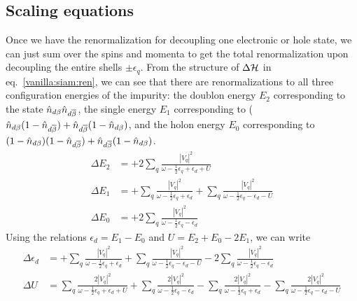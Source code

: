 \documentclass[12pt,twoside]{report}
\numberwithin{equation}{section}
\begin{document}
\subsection{Scaling equations}
Once we have the renormalization for decoupling one electronic or hole state, we can just sum over the spins and momenta to get the total renormalization upon decoupling the entire shells \(\pm \epsilon_q\). From the structure of \(\Delta \mathcal{H}\) in eq.~\ref{vanilla:siam:ren}, we can see that there are renormalizations to all three configuration energies of the impurity: the doublon energy \(E_2\) corresponding to the state  \(\hat n_{d\beta}\hat n_{d\overline\beta}\), the single energy \(E_1\) corresponding to (\(\hat n_{d\beta}(1 - \hat n_{d\overline\beta}) + \hat n_{d\overline\beta}(1 - \hat n_{d\beta})\), and the holon energy \(E_0\) corresponding to \((1 - \hat n_{d\beta})(1 - \hat n_{d\overline\beta}) + \hat n_{d\overline\beta}(1 - \hat n_{d\beta})\).
\begin{equation}\begin{aligned}
	\label{urg-siam}
	\Delta E_2 &= +2\sum_{q}\frac{|V_q|^2}{\omega - \frac{1}{2}\epsilon_q + \epsilon_d + U }\\
	\Delta E_1 &= +\sum_{q}\frac{|V_q|^2}{\omega - \frac{1}{2}\epsilon_q + \epsilon_d} + \sum_{q}\frac{|V_q|^2}{\omega - \frac{1}{2}\epsilon_q - \epsilon_d - U}\\
	\Delta E_0 &= +2\sum_{q}\frac{|V_q|^2}{\omega - \frac{1}{2}\epsilon_q - \epsilon_d}
\end{aligned}\end{equation}
Using the relations \(\epsilon_d = E_1 - E_0\) and \(U = E_2 + E_0 - 2E_1\), we can write
\begin{equation}\begin{aligned}
	\Delta \epsilon_d &= +\sum_{q}\frac{|V_q|^2}{\omega - \frac{1}{2}\epsilon_q + \epsilon_d} + \sum_{q}\frac{|V_q|^2}{\omega - \frac{1}{2}\epsilon_q - \epsilon_d - U} - 2\sum_{q}\frac{|V_q|^2}{\omega - \frac{1}{2}\epsilon_q - \epsilon_d}\\
	\Delta U &= \sum_{q}\frac{2|V_q|^2}{\omega - \frac{1}{2}\epsilon_q + \epsilon_d + U } + \sum_{q}\frac{2|V_q|^2}{\omega - \frac{1}{2}\epsilon_q - \epsilon_d} - \sum_{q}\frac{2|V_q|^2}{\omega - \frac{1}{2}\epsilon_q + \epsilon_d} - \sum_{q}\frac{2|V_q|^2}{\omega - \frac{1}{2}\epsilon_q - \epsilon_d - U}\\
\end{aligned}\end{equation}
\end{document}
